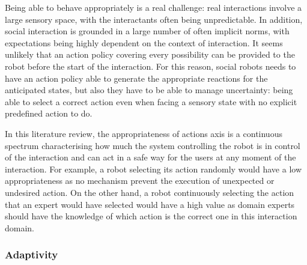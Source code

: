 
    Being able to behave appropriately is a real challenge: real interactions
    involve a large sensory space, with the interactants often being
    unpredictable. In addition, social interaction is grounded in a large number
    of often implicit norms, with expectations being highly dependent on the
    context of interaction.  It seems unlikely that an action policy covering
    every possibility can be provided to the robot before the start of the
    interaction. For this reason, social robots needs to have an action policy
    able to generate the appropriate reactions for the anticipated states, but
    also they have to be able to manage uncertainty: being able to select a
    correct action even when facing a sensory state with no explicit predefined
    action to do. 

    In this literature review, the appropriateness of actions axis is a
    continuous spectrum characterising how much the system controlling the robot
    is in control of the interaction and can act in a safe way for the users at
    any moment of the interaction. For example, a robot selecting its action
    randomly would have a low appropriateness as no mechanism prevent the
    execution of unexpected or undesired action. On the other hand, a robot
    continuously selecting the action that an expert would have selected would
    have a high value as domain experts should have the knowledge of which
    action is the correct one in this interaction domain.


\subsubsection{Adaptivity}	\label{ssec:adap}

